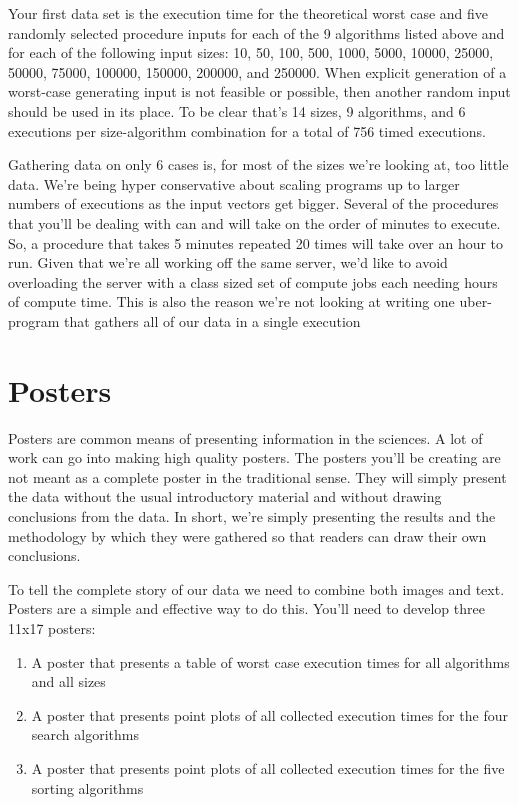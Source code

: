 \documentclass[]{tufte-handout}
\begin{document}
Your first data set is the execution time for the theoretical worst case and five randomly selected procedure inputs for each of the 9 algorithms listed above and for each of the following input sizes: 10, 50, 100, 500, 1000, 5000, 10000, 25000, 50000, 75000, 100000, 150000, 200000, and 250000. When explicit generation of a worst-case generating input is not feasible or possible, then another random input should be used in its place. To be clear that's 14 sizes, 9 algorithms, and 6 executions per size-algorithm combination for a total of 756 timed executions. 

Gathering data on only 6 cases is, for most of the sizes we're looking at, too little data. We're being hyper conservative about scaling programs up to larger numbers of executions as the input vectors get bigger. Several of the procedures that you'll be dealing with can and will take on the order of minutes to execute. So, a procedure that takes 5 minutes repeated 20 times will take over an hour to run. Given that we're all working off the same server, we'd like to avoid overloading the server with a class sized set of compute jobs each needing hours of compute time. This is also the reason we're not looking at writing one uber-program that gathers all of our data in a single execution

\section{Posters}

Posters are common means of presenting information in the sciences. A lot of work can go into making high quality posters. The posters you'll be creating are not meant as a complete poster in the traditional sense. They will simply present the data without the usual introductory material and without drawing conclusions from the data. In short, we're simply presenting the results and the methodology by which they were gathered so that readers can draw their own conclusions. 

To tell the complete story of our data we need to combine both images and text. Posters are a simple and effective way to do this. You'll need to develop three 11x17 posters:
\begin{enumerate}
\item A poster that presents a table of worst case execution times for all algorithms and all sizes
\item A poster that presents point plots of all collected execution times for the four search algorithms 
\item A poster that presents point plots of all collected execution times for the five sorting algorithms
\end{enumerate}
\end{document}
